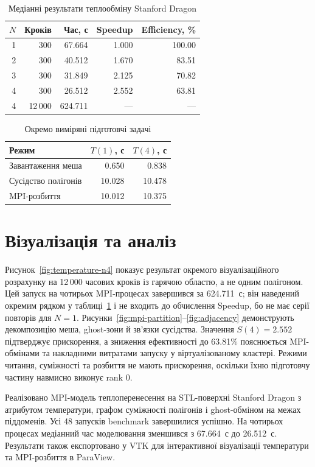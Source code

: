 \documentclass[14pt]{extarticle}
\begin{document}
\begin{table}
\caption{Медіанні результати теплообміну Stanford Dragon}
\centering
\begin{tabular}{rrrrr}
\toprule
$N$ & Кроків & Час, с & Speedup & Efficiency, \% \\
\midrule
1 & 300 & 67.664 & 1.000 & 100.00 \\
2 & 300 & 40.512 & 1.670 & 83.51 \\
3 & 300 & 31.849 & 2.125 & 70.82 \\
4 & 300 & 26.512 & 2.552 & 63.81 \\
4 & 12\,000 & 624.711 & --- & --- \\
\bottomrule
\end{tabular}
\label{tab:benchmark}
\end{table}

\begin{table}
\caption{Окремо виміряні підготовчі задачі}
\centering
\begin{tabular}{lrr}
\toprule
Режим & $T(1)$, с & $T(4)$, с \\
\midrule
Завантаження меша & 0.650 & 0.838 \\
Сусідство полігонів & 10.028 & 10.478 \\
MPI-розбиття & 10.012 & 10.375 \\
\bottomrule
\end{tabular}
\end{table}

\section{Візуалізація та аналіз}
Рисунок~\ref{fig:temperature-n4} показує результат окремого візуалізаційного розрахунку на 12\,000 часових кроків із гарячою областю, а не одним полігоном. Цей запуск на чотирьох MPI-процесах завершився за 624.711~с; він наведений окремим рядком у таблиці~\ref{tab:benchmark} і не входить до обчислення Speedup, бо не має серії повторів для $N=1$. Рисунки~\ref{fig:mpi-partition}--\ref{fig:adjacency} демонструють декомпозицію меша, ghost-зони й зв'язки сусідства. Значення $S(4)=2.552$ підтверджує прискорення, а зниження ефективності до 63.81\% пояснюється MPI-обмінами та накладними витратами запуску у віртуалізованому кластері. Режими читання, суміжності та розбиття не мають прискорення, оскільки їхню підготовчу частину навмисно виконує rank 0.



Реалізовано MPI-модель теплоперенесення на STL-поверхні Stanford Dragon з атрибутом температури, графом суміжності полігонів і ghost-обміном на межах піддоменів. Усі 48 запусків benchmark завершилися успішно. На чотирьох процесах медіанний час моделювання зменшився з 67.664~с до 26.512~с. Результати також експортовано у VTK для інтерактивної візуалізації температури та MPI-розбиття в ParaView.
\end{document}
